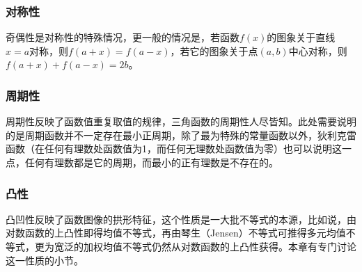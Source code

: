 \subsubsection{对称性}
\label{sec:function-general}

奇偶性是对称性的特殊情况，更一般的情况是，若函数$f(x)$的图象关于直线$x=a$对称，则$f(a+x)=f(a-x)$，若它的图象关于点$(a,b)$中心对称，则$f(a+x)+f(a-x)=2b$。

\subsubsection{周期性}
\label{sec:function-general}

周期性反映了函数值重复取值的规律，三角函数的周期性人尽皆知。此处需要说明的是周期函数并不一定存在最小正周期，除了最为特殊的常量函数以外，狄利克雷函数（在任何有理数处函数值为1，而任何无理数处函数值为零）也可以说明这一点，任何有理数都是它的周期，而最小的正有理数是不存在的。

\subsubsection{凸性}
\label{sec:function-general}

凸凹性反映了函数图像的拱形特征，这个性质是一大批不等式的本源，比如说，由对数函数的上凸性即得均值不等式，再由琴生（Jensen）不等式可推得多元均值不等式，更为宽泛的加权均值不等式仍然从对数函数的上凸性获得。本章有专门讨论这一性质的小节。

